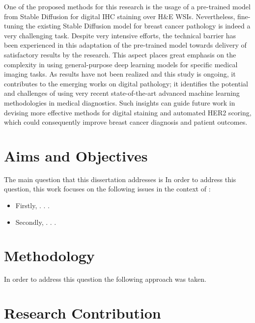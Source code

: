 One of the proposed methods for this research is the usage of a pre-trained model from Stable Diffusion for digital IHC staining over H\&E WSIs. Nevertheless, fine-tuning the existing Stable Diffusion model for breast cancer pathology is indeed a very challenging task. Despite very intensive efforts, the technical barrier has been experienced in this adaptation of the pre-trained model towards delivery of satisfactory results by the research. This aspect places great emphasis on the complexity in using general-purpose deep learning models for specific medical imaging tasks. As results have not been realized and this study is ongoing, it contributes to the emerging works on digital pathology; it identifies the potential and challenges of using very recent state-of-the-art advanced machine learning methodologies in medical diagnostics. Such insights can guide future work in devising more effective methods for digital staining and automated HER2 scoring, which could consequently improve breast cancer diagnosis and patient outcomes. 

\parencite{Zhang2023AddingModels}


\section{Aims and Objectives} 

The main question that this dissertation addresses is  
In order to address this question, this work focuses on the following issues in the context of :

\begin{itemize}

\item Firstly, . . .

\item Secondly, . . . 

\end{itemize}



\section{Methodology} 

In order to address this question the following approach was taken. 
 
 
\section{Research Contribution}


